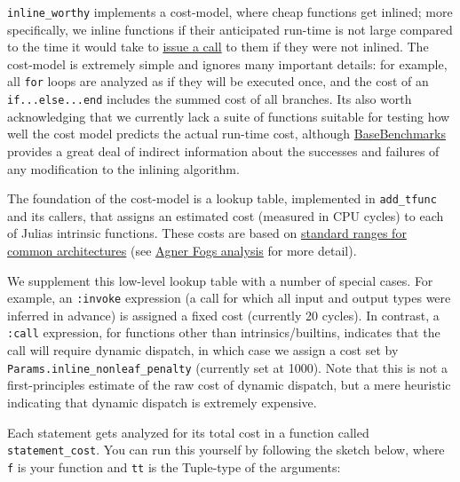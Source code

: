 \texttt{inline\_worthy} implements a cost-model, where {\textquotedbl}cheap{\textquotedbl} functions get inlined; more specifically, we inline functions if their anticipated run-time is not large compared to the time it would take to \href{https://en.wikipedia.org/wiki/Calling\_convention}{issue a call} to them if they were not inlined. The cost-model is extremely simple and ignores many important details: for example, all \texttt{for} loops are analyzed as if they will be executed once, and the cost of an \texttt{if...else...end} includes the summed cost of all branches. It{\textquotesingle}s also worth acknowledging that we currently lack a suite of functions suitable for testing how well the cost model predicts the actual run-time cost, although \href{https://github.com/JuliaCI/BaseBenchmarks.jl}{BaseBenchmarks} provides a great deal of indirect information about the successes and failures of any modification to the inlining algorithm.



The foundation of the cost-model is a lookup table, implemented in \texttt{add\_tfunc} and its callers, that assigns an estimated cost (measured in CPU cycles) to each of Julia{\textquotesingle}s intrinsic functions. These costs are based on \href{http://ithare.com/wp-content/uploads/part101\_infographics\_v08.png}{standard ranges for common architectures} (see \href{https://www.agner.org/optimize/instruction\_tables.pdf}{Agner Fog{\textquotesingle}s analysis} for more detail).



We supplement this low-level lookup table with a number of special cases. For example, an \texttt{:invoke} expression (a call for which all input and output types were inferred in advance) is assigned a fixed cost (currently 20 cycles). In contrast, a \texttt{:call} expression, for functions other than intrinsics/builtins, indicates that the call will require dynamic dispatch, in which case we assign a cost set by \texttt{Params.inline\_nonleaf\_penalty} (currently set at 1000). Note that this is not a {\textquotedbl}first-principles{\textquotedbl} estimate of the raw cost of dynamic dispatch, but a mere heuristic indicating that dynamic dispatch is extremely expensive.



Each statement gets analyzed for its total cost in a function called \texttt{statement\_cost}. You can run this yourself by following the sketch below, where \texttt{f} is your function and \texttt{tt} is the Tuple-type of the arguments:




